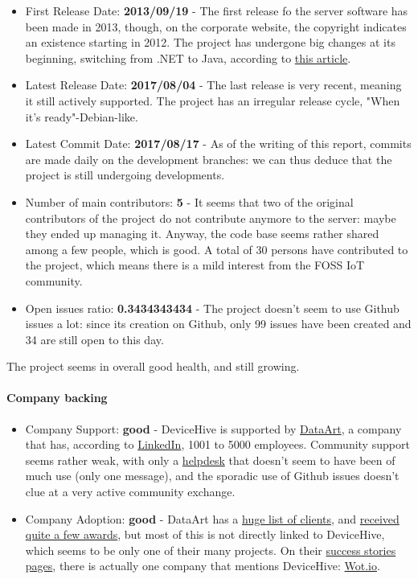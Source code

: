 \documentclass{article}
\begin{document}
\begin{itemize}
\item First Release Date: \textbf{2013/09/19} - The first release fo the server software has been made in 2013, though, on the corporate website, the copyright indicates an existence starting in 2012. The project has undergone big changes at its beginning, switching from .NET to Java, according to \href{http://www.techrepublic.com/blog/tablets-in-the-enterprise/devicehive-an-open-source-m2m-development-platform/}{this article}.
\item Latest Release Date: \textbf{2017/08/04} - The last release is very recent, meaning it still actively supported. The project has an irregular release cycle, "When it's ready"-Debian-like.
\item Latest Commit Date: \textbf{2017/08/17} - As of the writing of this report, commits are made daily on the development branches: we can thus deduce that the project is still undergoing developments.
\item Number of main contributors: \textbf{5} - It seems that two of the original contributors of the project do not contribute anymore to the server: maybe they ended up managing it. Anyway, the code base seems rather shared among a few people, which is good. A total of 30 persons have contributed to the project, which means there is a mild interest from the FOSS IoT community.
\item Open issues ratio: \textbf{0.3434343434} - The project doesn't seem to use Github issues a lot: since its creation on Github, only 99 issues have been created and 34 are still open to this day.
\end{itemize}

The project seems in overall good health, and still growing.

\paragraph{Company backing}

\begin{itemize}
\item Company Support: \textbf{good} - DeviceHive is supported by \href{http://www.dataart.com/}{DataArt}, a company that has, according to \href{https://www.linkedin.com/company/dataart}{LinkedIn}, 1001 to 5000 employees. Community support seems rather weak, with only a \href{https://docs.devicehive.com/discuss}{helpdesk} that doesn't seem to have been of much use (only one message), and the sporadic use of Github issues doesn't clue at a very active community exchange. 
\item Company Adoption: \textbf{good} - DataArt has a \href{http://www.dataart.com/clients/select-clients}{huge list of clients}, and \href{http://www.dataart.com/about-dataart/industry-recognition}{received quite a few awards}, but most of this is not directly linked to DeviceHive, which seems to be only one of their many projects. On their \href{http://www.dataart.com/clients/success-stories}{success stories pages}, there is actually one company that mentions DeviceHive: \href{http://www.interdigital.com/solution/wotio}{Wot.io}.
\end{itemize}
\end{document}
